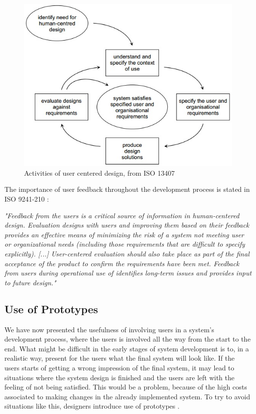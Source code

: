 \begin{figure} [H]
\centering
\includegraphics[scale=0.7]{userCenteredDesign.jpg}
\caption[User centered design]{Activities of user centered design, from ISO 13407 \cite{jokela2003standard}}
\label{userdesign}
\end{figure}

The importance of user feedback throughout the development process is stated in ISO 9241-210 \cite{dis20109241}:

\emph{"Feedback from the users is a critical source of information in human-centered design. Evaluation designs with users and improving them based on their feedback provides an effective means of minimizing the risk of a system not meeting user or organizational needs (including those requirements that are difficult to specify explicitly).  [...] User-centered evaluation should also take place as part of the final acceptance of the product to confirm the requirements have been met. Feedback from users during operational use of identifies long-term issues and provides input to future design."}

\subsection{Use of Prototypes}
\label{sec:prototypes}
We have now presented the usefulness of involving users in a system's development process, where the users is involved all the way from the start to the end. What might be difficult in the early stages of system development is to, in a realistic way, present for the users what the final system will look like. If the users starts of getting a wrong impression of the final system, it may lead to situations where the system design is finished and the users are left with the feeling of not being satisfied. This would be a problem, because of the high costs associated to making changes in the already implemented system. To try to avoid situations like this, designers introduce use of prototypes \cite{mmi}. 

